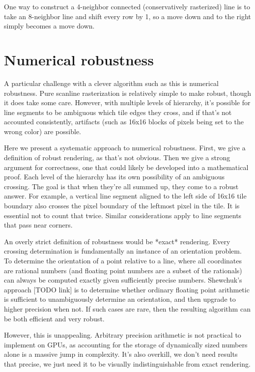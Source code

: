 \documentclass[format=acmsmall]{acmart}
\begin{document}
One way to construct a 4-neighbor connected (conservatively rasterized) line is to take an 8-neighbor line and shift every row by 1, so a move down and to the right simply becomes a move down.

\section{Numerical robustness}

A particular challenge with a clever algorithm such as this is numerical robustness. Pure scanline rasterization is relatively simple to make robust, though it does take some care. However, with multiple levels of hierarchy, it's possible for line segments to be ambiguous which tile edges they cross, and if that's not accounted consistently, artifacts (such as 16x16 blocks of pixels being set to the wrong color) are possible.

Here we present a systematic approach to numerical robustness. First, we give a definition of robust rendering, as that's not obvious. Then we give a strong argument for correctness, one that could likely be developed into a mathematical proof. Each level of the hierarchy has its own possibility of an ambiguous crossing. The goal is that when they're all summed up, they come to a robust answer. For example, a vertical line segment aligned to the left side of 16x16 tile boundary also crosses the pixel boundary of the leftmost pixel in the tile. It is essential not to count that twice. Similar considerations apply to line segments that pass near corners.

An overly strict definition of robustness would be *exact* rendering. Every crossing determination is fundamentally an instance of an orientation problem. To determine the orientation of a point relative to a line, where all coordinates are rational numbers (and floating point numbers are a subset of the rationals) can always be computed exactly given sufficiently precise numbers. Shewchuk's approach [TODO link] is to determine whether ordinary floating point arithmetic is sufficient to unambiguously determine an orientation, and then upgrade to higher precision when not. If such cases are rare, then the resulting algorithm can be both efficient and very robust.

However, this is unappealing. Arbitrary precision arithmetic is not practical to implement on GPUs, as accounting for the storage of dynamically sized numbers alone is a massive jump in complexity. It's also overkill, we don't need results that precise, we just need it to be visually indistinguishable from exact rendering.
\end{document}
